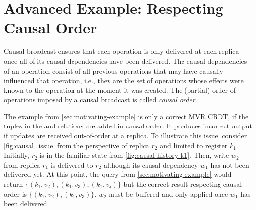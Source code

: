 \section{Advanced Example: Respecting Causal Order}\label{sec:advanced_example}



Causal broadcast ensures that each operation is only delivered at each replica
once all of its causal dependencies have been delivered.
The causal dependencies of an operation consist of all previous operations
that may have causally influenced that operation, i.e.,
they are the set of operations whose effects were known to the operation
at the moment it was created.
The (partial) order of operations imposed by a causal broadcast is
called \emph{causal order}.

The example from \autoref{sec:motivating-example} is only a correct \ac{MVR}
\ac{CRDT}, if the tuples in the  and  relations are added in
causal order.
It produces incorrect output if updates are received out-of-order at a replica.
To illustrate this issue, consider \autoref{fig:causal_issue} from the
perspective of replica \(r_2\) and limited to register \(k_1\).
Initially, \(r_2\) is in the familiar state from \autoref{fig:causal-history-k1}.
Then, write \(w_2\) from replica \(r_1\) is delivered to \(r_2\) although its
causal dependency \(w_1\) has not been delivered yet.
At this point, the query from \autoref{sec:motivating-example} would return
\(\{ (k_1, v_2), (k_1, v_3), (k_1, v_5)\} \)
but the correct result respecting causal order is
\(\{ (k_1, v_2), (k_1, v_3) \}\).
\(w_2\) must be buffered and only applied once \(w_1\) has been delivered.

